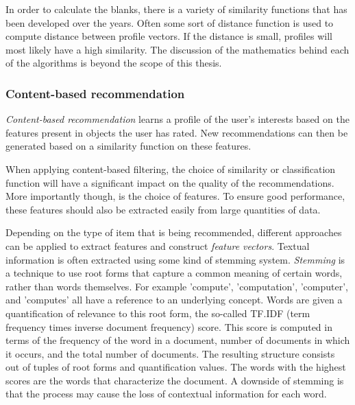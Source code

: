 In order to calculate the blanks, there is a variety of similarity functions that has been developed over the years. Often some sort of distance function is used to compute distance between profile vectors. If the distance is small, profiles will most likely have a high similarity\cite{rajaraman:2012}. The discussion of the mathematics behind each of the algorithms is beyond the scope of this thesis.



\subsubsection{Content-based recommendation}\label{chapter:literature_study:section:computer:subsection:algorithms:subsubsection:cbf}

\emph{Content-based recommendation} learns a profile of the user's interests based on the features present in objects the user has rated. New recommendations can then be generated based on a similarity function on these features\cite{burke:2002, pazzani:2007:CRS:1768197.1768209}.

When applying content-based filtering, the choice of similarity or classification function will have a significant impact on the quality of the recommendations. More importantly though, is the choice of features. To ensure good performance, these features should also be extracted easily from large quantities of data.


Depending on the type of item that is being recommended, different approaches can be applied to extract features and construct \emph{feature vectors}. Textual information is often extracted using some kind of stemming system\cite{rajaraman:2012}. \emph{Stemming} is a technique to use root forms that capture a common meaning of certain words, rather than words themselves. For example 'compute', 'computation', 'computer', and 'computes' all have a reference to an underlying concept. Words are given a quantification of relevance to this root form, the so-called TF.IDF (term frequency times inverse document frequency) score. This score is computed in terms of the frequency of the word in a document, number of documents in which it occurs, and the total number of documents. The resulting structure consists out of tuples of root forms and quantification values\cite{pazzani:2007:CRS:1768197.1768209, rajaraman:2012}. The words with the highest scores are the words that characterize the document\cite{rajaraman:2012}. A downside of stemming is that the process may cause the loss of contextual information for each word\cite{pazzani:2007:CRS:1768197.1768209}.

